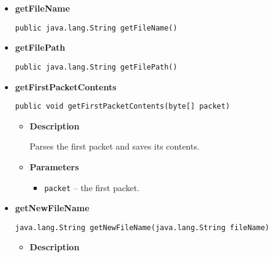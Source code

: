 {{{{{\begin{itemize}
{\begin{lstlisting}[frame=none]
public java.net.DatagramSocket getDataSocket()\end{lstlisting} %
}%
\item{ 
\hypertarget{filetransferUDP.FileTransfer.getFileName()}{{\bf  getFileName}\\}
\begin{lstlisting}[frame=none]
public java.lang.String getFileName()\end{lstlisting} %
}%
\item{ 
\hypertarget{filetransferUDP.FileTransfer.getFilePath()}{{\bf  getFilePath}\\}
\begin{lstlisting}[frame=none]
public java.lang.String getFilePath()\end{lstlisting} %
}%
\item{ 
\hypertarget{filetransferUDP.FileTransfer.getFirstPacketContents(byte[])}{{\bf  getFirstPacketContents}\\}
\begin{lstlisting}[frame=none]
public void getFirstPacketContents(byte[] packet)\end{lstlisting} %
\begin{itemize}
\item{
{\bf  Description}

Parses the first packet and saves its contents.
}
\item{
{\bf  Parameters}
  \begin{itemize}
   \item{
\texttt{packet} -- the first packet.}
  \end{itemize}
}%
\end{itemize}
}%
\item{ 
\hypertarget{filetransferUDP.FileTransfer.getNewFileName(java.lang.String)}{{\bf  getNewFileName}\\}
\begin{lstlisting}[frame=none]
 java.lang.String getNewFileName(java.lang.String fileName)\end{lstlisting} %
\begin{itemize}
\item{
{\bf  Description}

}
\end{itemize}}
\end{itemize}}}}}}
